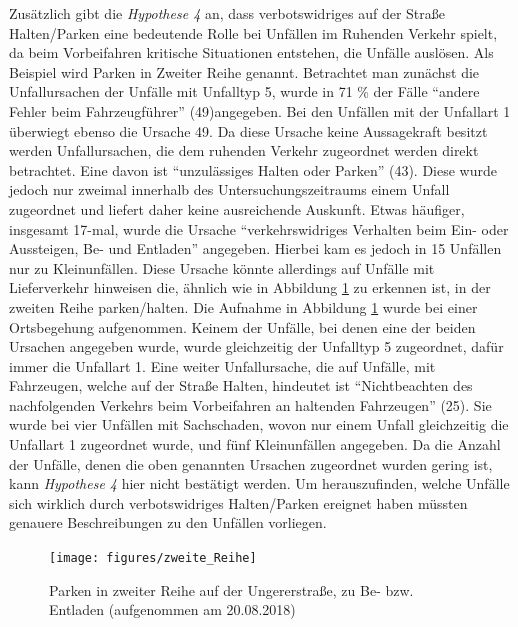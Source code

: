 Zusätzlich gibt die \textit{Hypothese 4} an, dass verbotswidriges auf der Straße Halten/Parken eine bedeutende Rolle bei Unfällen im Ruhenden Verkehr spielt, da beim Vorbeifahren kritische Situationen entstehen, die Unfälle auslösen. Als Beispiel wird Parken in Zweiter Reihe genannt. Betrachtet man zunächst die Unfallursachen der Unfälle mit Unfalltyp 5, wurde in 71 \% der Fälle \enquote{andere Fehler beim Fahrzeugführer} (49)angegeben. Bei den Unfällen mit der Unfallart 1 überwiegt ebenso die Ursache 49. Da diese Ursache keine Aussagekraft besitzt werden Unfallursachen, die dem ruhenden Verkehr zugeordnet werden direkt betrachtet. Eine davon ist \enquote{unzulässiges Halten oder Parken} (43). Diese wurde jedoch nur zweimal innerhalb des Untersuchungszeitraums einem Unfall zugeordnet und liefert daher keine ausreichende Auskunft. Etwas häufiger, insgesamt 17-mal, wurde die Ursache \enquote{verkehrswidriges Verhalten beim Ein- oder Aussteigen, Be- und Entladen} angegeben. Hierbei kam es jedoch in 15 Unfällen nur zu Kleinunfällen. Diese Ursache könnte allerdings auf Unfälle mit Lieferverkehr hinweisen die, ähnlich wie in Abbildung \ref{fig:Parken_zweite_Reihe} zu erkennen ist, in der zweiten Reihe parken/halten. Die Aufnahme in Abbildung \ref{fig:Parken_zweite_Reihe} wurde bei einer Ortsbegehung aufgenommen. Keinem der Unfälle, bei denen eine der beiden Ursachen angegeben wurde, wurde gleichzeitig der Unfalltyp 5 zugeordnet, dafür immer die Unfallart 1. Eine weiter Unfallursache, die auf Unfälle, mit Fahrzeugen, welche auf der Straße Halten, hindeutet ist \enquote{Nichtbeachten des nachfolgenden Verkehrs beim Vorbeifahren an haltenden Fahrzeugen} (25). Sie wurde bei vier Unfällen mit Sachschaden, wovon nur einem Unfall gleichzeitig die Unfallart 1 zugeordnet wurde, und fünf Kleinunfällen angegeben. Da die Anzahl der Unfälle, denen die oben genannten Ursachen zugeordnet wurden gering ist, kann \textit{Hypothese 4} hier nicht bestätigt werden. Um herauszufinden, welche Unfälle sich wirklich durch verbotswidriges Halten/Parken ereignet haben müssten genauere Beschreibungen zu den Unfällen vorliegen. %

\begin{savenotes}
	\begin{figure}[H]
		\centering
		\texttt{[image: figures/zweite\_Reihe]}
		\caption[Parken in zweiter Reihe auf der Ungererstraße, zu Be- bzw. Entladen]{Parken in zweiter Reihe auf der Ungererstraße, zu Be- bzw. Entladen (aufgenommen am 20.08.2018)}\label{fig:Parken_zweite_Reihe}
	\end{figure}
\end{savenotes}

